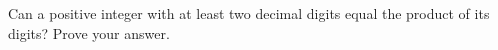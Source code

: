 Can a positive integer with at least two decimal digits equal the product of its digits? Prove your answer.
